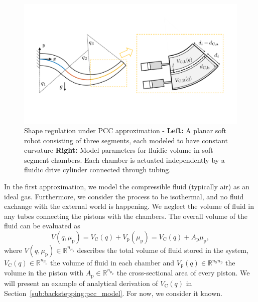 \begin{figure}[ht]
  \centering
  \includegraphics[width=0.9\columnwidth]{backstepping/figures/backstepping_graphics_pcc_case_overview_v4_cropped.pdf}
  \caption{Shape regulation under \gls{PCC} approximation - \textbf{Left:} A planar soft robot consisting of three segments, each modeled to have constant curvature \textbf{Right:} Model parameters for fluidic volume in soft segment chambers. Each chamber is actuated independently by a fluidic drive cylinder connected through tubing.}\label{fig:backstepping:pcc_case_overview}
\end{figure}


In the first approximation, we model the compressible fluid (typically air) as an ideal gas. Furthermore, we consider the process to be isothermal, and no fluid exchange with the external world is happening. We neglect the volume of fluid in any tubes connecting the pistons with the chambers.
%
The overall volume of the fluid can be evaluated as %
%
\begin{equation}
V(q,\mu_\mathrm{p}) = V_{\mathrm{C}}(q) + V_{\mathrm{p}}(\mu_{\mathrm{p}}) = V_{\mathrm{C}}(q) + A_{\mathrm{p}} \mu_{\mathrm{p}}, 
\end{equation}
%
where $V(q,\mu_\mathrm{p}) \in \mathbb{R}^{n_{\mu_\mathrm{p}}}$ describes the total volume of fluid stored in the system, $V_{\mathrm{C}}(q) \in \mathbb{R}^{n_{\mu_\mathrm{p}}}$ the volume of fluid in each chamber and $V_{\mathrm{p}}(q) \in \mathbb{R}^{n_{\mathrm{S}} n_{\mathrm{p}}}$ the volume in the piston with $A_{\mathrm{p}} \in \mathbb{R}^{n_{\mu_\mathrm{p}}}$ the cross-sectional area of every piston.
%
%
We will present an example of analytical derivation of $V_{\mathrm{C}}(q)$ in Section~\ref{sub:backstepping:pcc_model}.
For now, we consider it known.

